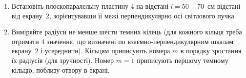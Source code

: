 \begin{enumerate}[label*=\arabic*.]
	\item \label{p1}Встановіть плоскопаралельну пластину \hyperref[fig:scheme]{$4$} на відстані $ l = 50-70$~см відстані від екрану~\hyperref[fig:scheme]{$2$}, зорієнтувавши її межі перпендикулярно осі світлового пучка.
	\item \label{p2} Виміряйте радіуси не менше шести темних кілець (для кожного кільця треба отримати 4 значення, що визначені по взаємно-перпендикулярним шкалам екрану~\hyperref[fig:scheme]{$2$} і усереднити). Кільцям приписують номера $m$ в порядку зростання їх радіусів  (для зручності). Номер $m = 1$ приписують першому темному кільцю,  поблизу отвору в екрані.

\end{enumerate}
